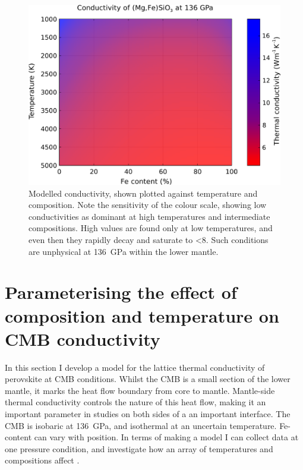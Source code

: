 \begin{figure}[h!]
  \includegraphics[width=\linewidth]{Figures/K_over_T_over_X.png}
  \caption{Modelled conductivity, shown plotted against temperature and composition. Note the sensitivity of the colour scale, showing low conductivities as dominant at high temperatures and intermediate compositions. High values are found only at low temperatures, and even then they rapidly decay and saturate to <8\wmk. Such conditions are unphysical at 136~GPa within the lower mantle.}
  \label{fig:kappa-temp-comp_01}
\end{figure}



\section{Parameterising the effect of composition and temperature on CMB conductivity}

In this section I develop a model for the lattice thermal conductivity of \mgfesios perovskite at CMB conditions. Whilst the CMB is a small section of the lower mantle, it marks the heat flow boundary from core to mantle. Mantle-side thermal conductivity controls the nature of this heat flow, making it an important parameter in studies on both sides of a an important interface. The CMB is isobaric at 136~GPa, and isothermal at an uncertain temperature. Fe-content can vary with position. In terms of making a model I can collect data at one pressure condition, and investigate how an array of temperatures and compositions affect \tc.

